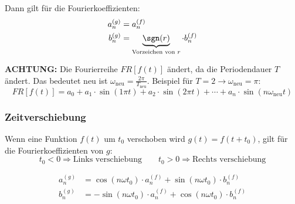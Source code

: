 \noindent Dann gilt für die Fourierkoeffizienten:
\begin{align*}
	a_n^{(g)} &= a_n^{(f)} \\
	b_n^{(g)} &= \underbrace{\sgn(r)}_{\text{Vorzeichen von } r} \cdot b_n^{(f)} \\
\end{align*}

\noindent\textbf{ACHTUNG:} Die Fourierreihe $FR[f(t)]$ ändert, da die Periodendauer $T$ ändert. Das bedeutet neu ist $\omega_{\text{neu}} = \frac{2\pi}{T_{\text{neu}}}$. Beispiel für $T = 2 \rightarrow \omega_{\text{neu}} = \pi$:
\[
FR[f(t)] = a_0 + a_1\cdot\sin(1\pi t) + a_2\cdot\sin(2\pi t) + \cdots + a_n\cdot\sin(n\omega_{\text{neu}} t)
\]

\subsubsection{Zeitverschiebung}
Wenn eine Funktion $f(t)$ um $t_0$ verschoben wird $g(t) = f(t + t_0)$, gilt für die Fourierkoeffizienten von $g$:
\[
t_0 < 0 \Rightarrow \text{Links verschiebung} \qquad t_0 > 0 \Rightarrow \text{Rechts verschiebung}
\]

\begin{align*}
	a_n^{(g)} &= \cos(n\omega t_0) \cdot a_n^{(f)} + \sin(n\omega t_0) \cdot b_n^{(f)}  \\
	b_n^{(g)} &= -\sin(n\omega t_0) \cdot a_n^{(f)} + \cos(n\omega t_0) \cdot b_n^{(f)}  \\
\end{align*}

